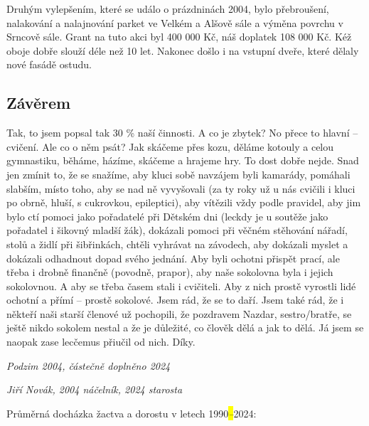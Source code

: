 Druhým vylepšením, které se událo o prázdninách 2004, bylo přebroušení,
nalakování a nalajnování parket ve Velkém a Alšově sále a výměna povrchu
v Srncově sále. Grant na tuto akci byl 400 000 Kč, náš doplatek 108 000
Kč. Kéž oboje dobře slouží déle než 10 let. Nakonec došlo i na vstupní
dveře, které dělaly nové fasádě ostudu.

\subsection{Závěrem}\label{zuxe1vux11brem}

Tak, to jsem popsal tak 30 \% naší činnosti. A co je zbytek? No přece to
hlavní -- cvičení. Ale co o něm psát? Jak skáčeme přes kozu, děláme
kotouly a celou gymnastiku, běháme, házíme, skáčeme a hrajeme hry. To
dost dobře nejde. Snad jen zmínit to, že se snažíme, aby kluci sobě
navzájem byli kamarády, pomáhali slabším, místo toho, aby se nad ně
vyvyšovali (za ty roky už u nás cvičili i kluci po obrně, hluší, s
cukrovkou, epileptici), aby vítězili vždy podle pravidel, aby jim bylo
ctí pomoci jako pořadatelé při Dětském dni (leckdy je u soutěže jako
pořadatel i šikovný mladší žák), dokázali pomoci při věčném stěhování
nářadí, stolů a židlí při šibřinkách, chtěli vyhrávat na závodech, aby
dokázali myslet a dokázali odhadnout dopad svého jednání. Aby byli
ochotni přispět prací, ale třeba i drobně finančně (povodně, prapor),
aby naše sokolovna byla i jejich sokolovnou. A aby se třeba časem stali
i cvičiteli. Aby z nich prostě vyrostli lidé ochotní a přímí -- prostě
sokolové. Jsem rád, že se to daří. Jsem také rád, že i někteří naši
starší členové už pochopili, že pozdravem Nazdar, sestro/bratře, se
ještě nikdo sokolem nestal a že je důležité, co člověk dělá a jak to
dělá. Já jsem se naopak zase lecčemus přiučil od nich. Díky.

\emph{Podzim 2004, částečně doplněno 2024}

\emph{Jiří Novák, 2004 náčelník, 2024 starosta}

Průměrná docházka žactva a dorostu v letech 1990\emph{\hl{--}}2024:


